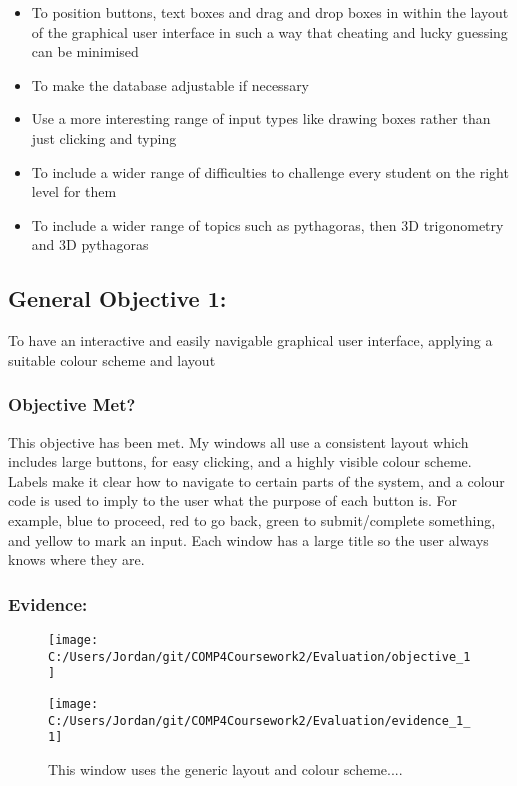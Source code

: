 \begin{itemize}
	\item To position buttons, text boxes and drag and drop boxes in within the layout of the graphical user interface in such a way that cheating and lucky guessing can be minimised
	\item To make the database adjustable if necessary
	\item Use a more interesting range of input types like drawing boxes rather than just clicking and typing
	\item To include a wider range of difficulties to challenge every student on the right level for them
	\item To include a wider range of topics such as pythagoras, then 3D trigonometry and 3D pythagoras
\end{itemize}

\subsection{General Objective 1: }

To have an interactive and easily navigable graphical user interface, applying a suitable colour scheme and layout

\subsubsection{Objective Met?}

This objective has been met. My windows all use a consistent layout which includes large buttons, for easy clicking, and a highly visible colour scheme. Labels make it clear how to navigate to certain parts of the system, and a colour code is used to imply to the user what the purpose of each button is. For example, blue to proceed, red to go back, green to submit/complete something, and yellow to mark an input. Each window has a large title so the user always knows where they are.

\subsubsection{Evidence: }

\begin{figure}[H]
	\texttt{[image: C:/Users/Jordan/git/COMP4Coursework2/Evaluation/objective\_1]}
\end{figure}

\begin{figure}[H]
	\texttt{[image: C:/Users/Jordan/git/COMP4Coursework2/Evaluation/evidence\_1\_1]}
	\caption{This window uses the generic layout and colour scheme....}
\end{figure}

